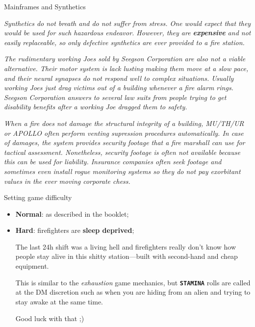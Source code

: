 \clearpage


\begin{rpg-commentbox}{Mainframes and Synthetics}
\begin{small}
    \textit{Synthetics do not breath and do not suffer from stress. One would expect that they would be used for such hazardous endeavor. 
    However, they are \textbf{expensive} and not easily replaceable, so only defective synthetics are ever provided to a fire station. }


    \textit{The rudimentary working Joes 
    sold by Seegson Corporation are also not a viable alternative. Their motor system is lack lusting making them move at a slow pace, and their neural synapses do not respond well to complex situations. Usually working Joes just drag victims out of a building whenever a fire alarm rings. Seegson Corporation answers to several law suits from people trying to get disability benefits after a working Joe dragged them to safety.}

    \textit{When a fire does not damage the structural integrity of a building, MU/TH/UR or APOLLO often perform venting supression procedures automatically. In case of damages, the system provides security footage that a fire marshall can use for tactical assessment. Nonetheless, security footage is often not available because this can be used for liability. Insurance companies often seek footage and sometimes even install rogue monitoring systems so they do not pay exorbitant values in the ever moving corporate chess.}

\end{small}
\end{rpg-commentbox}

\newsect



\medskip
\begin{rpg-commentbox}{Setting game difficulty}
\begin{itemize}
    \item \textbf{Normal}: as described in the booklet;
    \item \textbf{Hard}: firefighters are \textbf{sleep deprived}; 
    
    The last 24h shift was a living hell and firefighters really don't know how people stay alive in this shitty station---built with second-hand and cheap equipment. 
    
    This is similar to the \textit{exhaustion} game mechanics,
    but \texttt{\textbf{STAMINA}} rolls are called at the DM discretion such as when you are hiding from an alien and trying to stay awake at the same time. 
    
    Good luck with that ;)
\end{itemize}
\end{rpg-commentbox}




